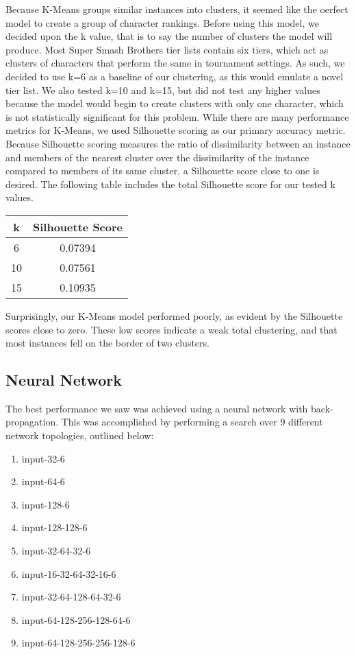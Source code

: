 \documentclass{article}
\begin{document}
Because K-Means groups similar instances into clusters, it seemed like the oerfect model to create a group of character rankings.
Before using this model, we decided upon the k value, that is to say the number of clusters the model will produce.
Most Super Smash Brothers tier lists contain six tiers, which act as clusters of characters that perform the same in tournament settings.
As such, we decided to use k=6 as a baseline of our clustering, as this would emulate a novel tier list.
We also tested k=10 and k=15, but did not test any higher values because the model would begin to create clusters with only one character, which is not statistically significant for this problem.
While there are many performance metrics for K-Means, we used Silhouette scoring as our primary accuracy metric.
Because Silhouette scoring measures the ratio of dissimilarity between an instance and members of the nearest cluster over the dissimilarity of the instance compared to members of its same cluster, a Silhouette score close to one is desired.
The following table includes the total Silhouette score for our tested k values.

\begin{center}
\begin{tabular}{c c}
\toprule
k & Silhouette Score\\
\midrule
6 & 0.07394\\
10 & 0.07561\\
15 & 0.10935\\
\bottomrule
\end{tabular}
\end{center}

Surprisingly, our K-Means model performed poorly, as evident by the Silhouette scores close to zero.
These low scores indicate a weak total clustering, and that most instances fell on the border of two clusters.

\subsection{Neural Network}

The best performance we saw was achieved using a neural network with back-propagation. This was accomplished by performing a search over 9 different network topologies, outlined below:

\begin{enumerate}
    \item input-32-6
    \item input-64-6
    \item input-128-6
    \item input-128-128-6
    \item input-32-64-32-6
    \item input-16-32-64-32-16-6
    \item input-32-64-128-64-32-6
    \item input-64-128-256-128-64-6
    \item input-64-128-256-256-128-6
\end{enumerate}
\end{document}
